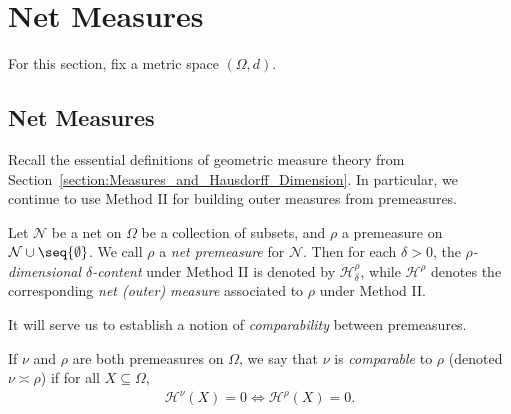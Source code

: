 \section{Net Measures}
\label{section:Net_Measures}

For this section, fix a metric space $(\Omega, d)$.

\subsection{Net Measures}

Recall the essential definitions of geometric measure theory from Section~\ref{section:Measures_and_Hausdorff_Dimension}. In particular, we continue to use Method II for building outer measures from premeasures.

\begin{definition}
    Let $\mathcal{N}$ be a net on $\Omega$ be a collection of subsets, and $\rho$ a premeasure on $\mathcal{N} \cup \seq{\emptyset}$. We call $\rho$ a \textit{net premeasure} for $\mathcal{N}$. Then for each $\delta > 0$, the \textit{$\rho$-dimensional $\delta$-content} under Method II is denoted by $\mathcal{H}^\rho_\delta$, while $\mathcal{H}^\rho$ denotes the corresponding \textit{net (outer) measure} associated to $\rho$ under Method II.
\end{definition}

It will serve us to establish a notion of \textit{comparability} between premeasures.

\begin{definition}
    If $\nu$ and $\rho$ are both premeasures on $\Omega$, we say that $\nu$ is \textit{comparable} to $\rho$ (denoted $\nu \asymp \rho$) if for all $X \subseteq \Omega$, 
    \begin{align*}
        \mathcal{H}^\nu(X) = 0 \iff \mathcal{H}^\rho(X) = 0.
    \end{align*}
\end{definition}

